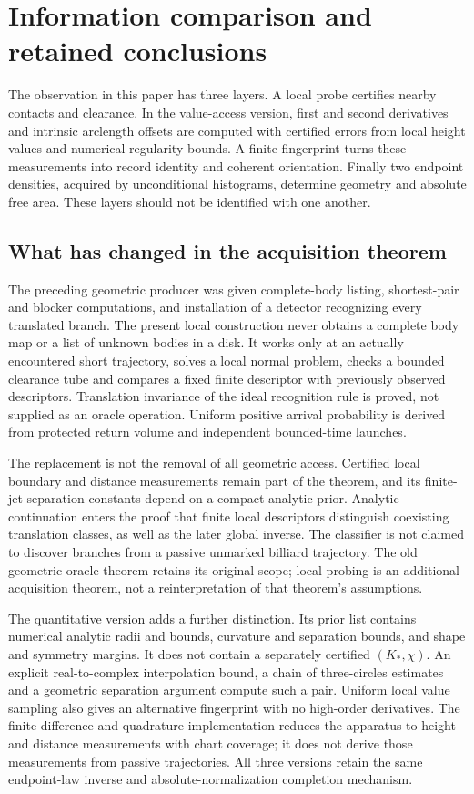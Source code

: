 \section{Information comparison and retained conclusions}
\label{sec:comparison}
The observation in this paper has three layers. A local probe certifies
nearby contacts and clearance. In the value-access version, first and
second derivatives and intrinsic arclength offsets are computed with
certified errors from local height values and numerical regularity bounds. A finite
fingerprint turns these measurements into record identity and coherent
orientation. Finally two endpoint densities, acquired by unconditional
histograms, determine geometry and absolute free area. These layers
should not be identified with one another.

\subsection{What has changed in the acquisition theorem}
The preceding geometric producer was given complete-body listing,
shortest-pair and blocker computations, and installation of a detector
recognizing every translated branch. The present local construction
never obtains a complete body map or a list of unknown bodies in a disk.
It works only at an actually encountered short trajectory, solves a local
normal problem, checks a bounded clearance tube and compares a fixed
finite descriptor with previously observed descriptors. Translation
invariance of the ideal recognition rule is proved, not supplied as an
oracle operation. Uniform positive arrival probability is derived from
protected return volume and independent bounded-time launches.

The replacement is not the removal of all geometric access. Certified
local boundary and distance measurements remain part of the theorem,
and its finite-jet separation constants depend on a compact analytic
prior. Analytic continuation enters the proof that finite local descriptors
distinguish coexisting translation classes, as well as the later global
inverse. The classifier is not claimed to discover branches from a passive
unmarked billiard trajectory. The old geometric-oracle theorem retains
its original scope; local probing is an additional acquisition theorem,
not a reinterpretation of that theorem's assumptions.

The quantitative version adds a further distinction. Its prior list
contains numerical analytic radii and bounds, curvature and separation
bounds, and shape and symmetry margins. It does not contain a separately
certified $(K_*,\chi)$. An explicit real-to-complex interpolation bound,
a chain of three-circles estimates and a geometric separation argument
compute such a pair. Uniform local value sampling also gives an alternative
fingerprint with no high-order derivatives. The finite-difference and
quadrature implementation reduces the apparatus to height and distance
measurements with chart coverage; it does not derive those measurements
from passive trajectories. All three versions retain the same endpoint-law
inverse and absolute-normalization completion mechanism.

